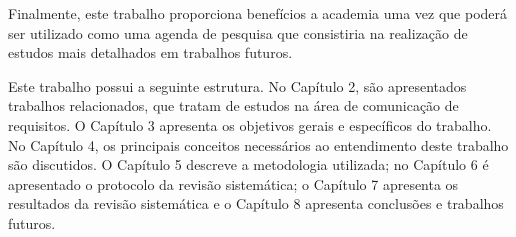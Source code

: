Finalmente, este trabalho proporciona benefícios a academia uma vez que poderá ser utilizado como uma agenda de pesquisa que consistiria na realização de estudos mais detalhados em trabalhos futuros.

Este trabalho possui a seguinte estrutura. No Capítulo 2, são apresentados trabalhos relacionados, que tratam de estudos na área de comunicação de requisitos. O Capítulo 3 apresenta os objetivos gerais e específicos do trabalho. No Capítulo 4, os principais conceitos necessários ao entendimento deste trabalho são discutidos. O Capítulo 5 descreve a metodologia utilizada; no Capítulo 6 é apresentado o protocolo da revisão sistemática; o Capítulo 7 apresenta os resultados da revisão sistemática e o Capítulo 8 apresenta conclusões e trabalhos futuros.
